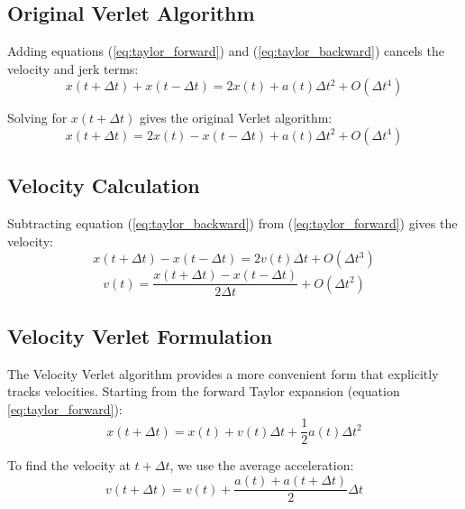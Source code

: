 \subsection{Original Verlet Algorithm}

Adding equations (\ref{eq:taylor_forward}) and (\ref{eq:taylor_backward}) cancels the velocity and jerk terms:
\begin{equation}
    x(t+\Delta t) + x(t-\Delta t) = 2x(t) + a(t)\Delta t^2 + O(\Delta t^4)
\end{equation}

Solving for $x(t+\Delta t)$ gives the original Verlet algorithm:
\begin{equation}
    x(t+\Delta t) = 2x(t) - x(t-\Delta t) + a(t)\Delta t^2 + O(\Delta t^4)
    \label{eq:verlet_original}
\end{equation}

\subsection{Velocity Calculation}

Subtracting equation (\ref{eq:taylor_backward}) from (\ref{eq:taylor_forward}) gives the velocity:
\begin{equation}
    x(t+\Delta t) - x(t-\Delta t) = 2v(t)\Delta t + O(\Delta t^3)
\end{equation}
\begin{equation}
    v(t) = \frac{x(t+\Delta t) - x(t-\Delta t)}{2\Delta t} + O(\Delta t^2)
    \label{eq:verlet_velocity}
\end{equation}

\subsection{Velocity Verlet Formulation}

The Velocity Verlet algorithm provides a more convenient form that explicitly tracks velocities. Starting from the forward Taylor expansion (equation \ref{eq:taylor_forward}):
\begin{equation}
    x(t+\Delta t) = x(t) + v(t)\Delta t + \frac{1}{2}a(t)\Delta t^2
    \label{eq:vv_position}
\end{equation}

To find the velocity at $t+\Delta t$, we use the average acceleration:
\begin{equation}
    v(t+\Delta t) = v(t) + \frac{a(t) + a(t+\Delta t)}{2}\Delta t
    \label{eq:vv_velocity_simple}
\end{equation}


